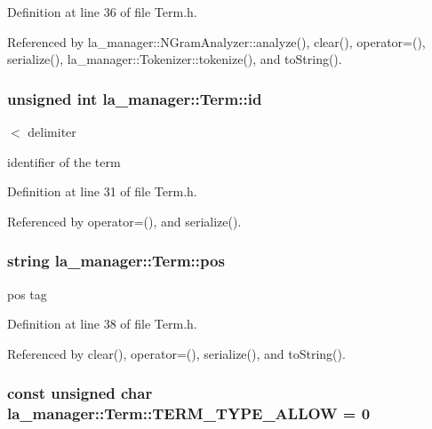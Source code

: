 Definition at line 36 of file Term.h.

Referenced by la\_\-manager::NGramAnalyzer::analyze(), clear(), operator=(), serialize(), la\_\-manager::Tokenizer::tokenize(), and toString().\hypertarget{classla__manager_1_1Term_11a2e90f4d10c183640b072356fd6b38}{
\subsubsection[{id}]{\setlength{\rightskip}{0pt plus 5cm}unsigned int {\bf la\_\-manager::Term::id}}}
\label{classla__manager_1_1Term_11a2e90f4d10c183640b072356fd6b38}


$<$ delimiter 

identifier of the term 

Definition at line 31 of file Term.h.

Referenced by operator=(), and serialize().\hypertarget{classla__manager_1_1Term_a4fef1d69d4868c0cc7a35b58c61d4aa}{
\subsubsection[{pos}]{\setlength{\rightskip}{0pt plus 5cm}string {\bf la\_\-manager::Term::pos}}}
\label{classla__manager_1_1Term_a4fef1d69d4868c0cc7a35b58c61d4aa}


pos tag 



Definition at line 38 of file Term.h.

Referenced by clear(), operator=(), serialize(), and toString().\hypertarget{classla__manager_1_1Term_ec1b1555fbf13256b27fdb0903327704}{
\subsubsection[{TERM\_\-TYPE\_\-ALLOW}]{\setlength{\rightskip}{0pt plus 5cm}const unsigned char {\bf la\_\-manager::Term::TERM\_\-TYPE\_\-ALLOW} = 0}}
\label{classla__manager_1_1Term_ec1b1555fbf13256b27fdb0903327704}




